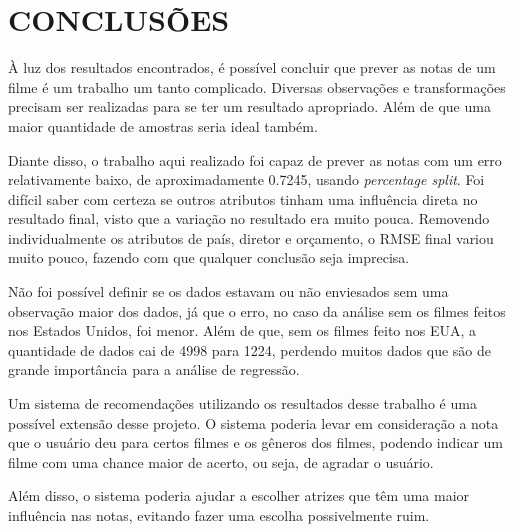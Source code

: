 \section{CONCLUSÕES}
À luz dos resultados encontrados, é possível concluir que prever as notas de um filme é um trabalho um tanto complicado. Diversas observações e transformações precisam ser realizadas para se ter um resultado apropriado. Além de que uma maior quantidade de amostras seria ideal também.

Diante disso, o trabalho aqui realizado foi capaz de prever as notas com um erro relativamente baixo, de aproximadamente 0.7245, usando \textit{percentage split}. Foi difícil saber com certeza se outros atributos tinham uma influência direta no resultado final, visto que a variação no resultado era muito pouca. Removendo individualmente os atributos de país, diretor e orçamento, o RMSE final variou muito pouco, fazendo com que qualquer conclusão seja imprecisa.

Não foi possível definir se os dados estavam ou não enviesados sem uma observação maior dos dados, já que o erro, no caso da análise sem os filmes feitos nos Estados Unidos, foi menor. Além de que, sem os filmes feito nos EUA, a quantidade de dados cai de 4998 para 1224, perdendo muitos dados que são de grande importância para a análise de regressão.

Um sistema de recomendações utilizando os resultados desse trabalho é uma possível extensão desse projeto. O sistema poderia levar em consideração a nota que o usuário deu para certos filmes e os gêneros dos filmes, podendo indicar um filme com uma chance maior de acerto, ou seja, de agradar o usuário.

Além disso, o sistema poderia ajudar a escolher atrizes que têm uma maior influência nas notas, evitando fazer uma escolha possivelmente ruim.